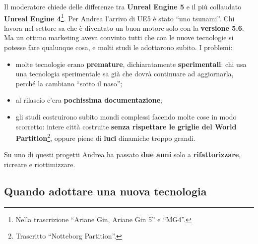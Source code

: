 Il moderatore chiede delle differenze tra \textbf{Unreal Engine 5} e il più
collaudato \textbf{Unreal Engine 4}\footnote{Nella trascrizione ``Ariane Gin,
Ariane Gin 5'' e ``MG4''.}. Per Andrea l'arrivo di UE5 è stato ``uno tsunami''. Chi
lavora nel settore sa che è diventato un buon motore solo con la \textbf{versione
5.6}. Ma un ottimo marketing aveva convinto tutti che con le nuove tecnologie si
potesse fare qualunque cosa, e molti studi le adottarono subito. I problemi:
\begin{itemize}
  \item molte tecnologie erano \textbf{premature}, dichiaratamente
        \textbf{sperimentali}: chi usa una tecnologia sperimentale sa già che
        dovrà continuare ad aggiornarla, perché la cambiano ``sotto il naso'';
  \item al rilascio c'era \textbf{pochissima documentazione};
  \item gli studi costruirono subito mondi complessi facendo molte cose in modo
        scorretto: intere città costruite \textbf{senza rispettare le griglie del
        World Partition}\footnote{Trascritto ``Notteborg Partition''.}, oppure
        piene di \textbf{luci} dinamiche troppo grandi.
\end{itemize}
Su uno di questi progetti Andrea ha passato \textbf{due anni} solo a
\textbf{rifattorizzare}, ricreare e riottimizzare.

\subsection{Quando adottare una nuova tecnologia}

